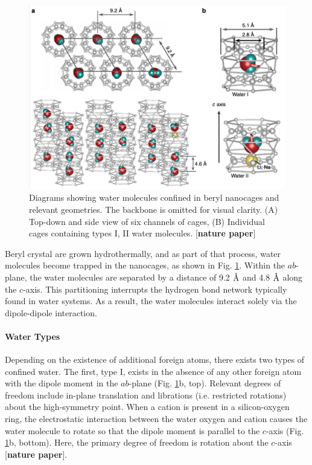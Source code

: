         \begin{figure}
            \centering
            \includegraphics[width=0.9\linewidth]{Figures/System/beryl_water.png}
            \caption{Diagrams showing water molecules confined in beryl nanocages and relevant geometries. The backbone is omitted for visual clarity. (A) Top-down and side view of six channels of cages, (B) Individual cages containing types I, II water molecules. [\textbf{nature paper}]}
            \label{fig:beryl_water}
        \end{figure}
        
        Beryl crystal are grown hydrothermally, and as part of that process, water molecules become trapped in the nanocages, as shown in Fig. \ref{fig:beryl_water}. Within the $ab$-plane, the water molecules are separated by a distance of 9.2 $\text{\normalfont\AA}$ and 4.8 $\text{\normalfont\AA}$ along the $c$-axis. This partitioning interrupts the hydrogen bond network typically found in water systems. As a result, the water molecules interact solely via the dipole-dipole interaction. 
        
        \paragraph{Water Types} Depending on the existence of additional foreign atoms, there exists two types of confined water. The first, type I, exists in the absence of any other foreign atom with the dipole moment in the $ab$-plane (Fig. \ref{fig:beryl_water}b, top). Relevant degrees of freedom include in-plane translation and librations (i.e. restricted rotations) about the high-symmetry point. When a cation is present in a silicon-oxygen ring, the electrostatic interaction between the water oxygen and cation causes the water molecule to rotate so that the dipole moment is parallel to the $c$-axis (Fig. \ref{fig:beryl_water}b, bottom). Here, the primary degree of freedom is rotation about the $c$-axis [\textbf{nature paper}]. 
        
